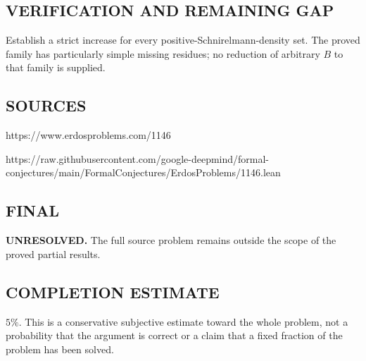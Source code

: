 \subsection*{VERIFICATION AND REMAINING GAP}
Establish a strict increase for every positive-Schnirelmann-density set.
The proved family has particularly simple missing residues; no reduction of
arbitrary $B$ to that family is supplied.

\subsection*{SOURCES}
https://www.erdosproblems.com/1146

https://raw.githubusercontent.com/google-deepmind/formal-conjectures/main/FormalConjectures/ErdosProblems/1146.lean

\subsection*{FINAL}
\textbf{UNRESOLVED.} The full source problem remains outside the scope of the proved partial results.

\subsection*{COMPLETION ESTIMATE}
$5\%$. This is a conservative subjective estimate toward the whole problem, not a probability that the argument is correct or a claim that a fixed fraction of the problem has been solved.
